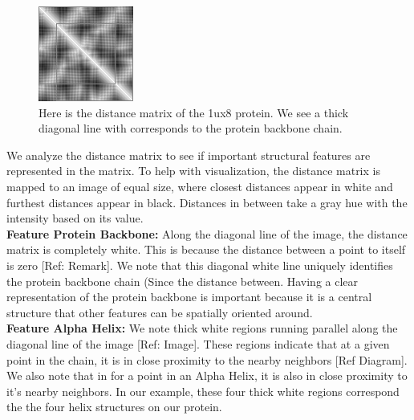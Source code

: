 \documentclass[12pt, a4paper, twocolumn, fullpage]{article}
\theoremstyle{plain}
\theoremstyle{definition}
\theoremstyle{remark}
\begin{document}
\begin{figure}[h]
    \centering
    \includegraphics[width=.7\linewidth]{1ux8matBase}
    \caption{Here is the distance matrix of the 1ux8 protein. We see a thick diagonal line with corresponds to the protein backbone chain.}
    \label{1ux8matBase}
\end{figure}
    
We analyze the distance matrix to see if important structural features are represented in the matrix. To help with visualization, the distance matrix is mapped to an image of equal size, where closest distances appear in white and furthest distances appear in black. Distances in between take a gray hue with the intensity based on its value.
\\
\noindent
\textbf{Feature Protein Backbone:}
Along the diagonal line of the image, the distance matrix is completely white. This is because the distance between a point to itself is zero [Ref: Remark]. We note that this diagonal white line uniquely identifies the protein backbone chain (Since the distance between. Having a clear representation of the protein backbone is important because  it is a central structure that other features can be spatially oriented around.
\\
\noindent
\textbf{Feature Alpha Helix:}
We note thick white regions running parallel along the diagonal line of the image [Ref: Image]. These regions indicate that at a given point in the chain, it is in close proximity to the nearby neighbors [Ref Diagram]. We also note that in for a point in an Alpha Helix, it is also in close proximity to it's nearby neighbors. In our example, these four thick white regions correspond the the four helix structures on our protein.
    
\end{document}
